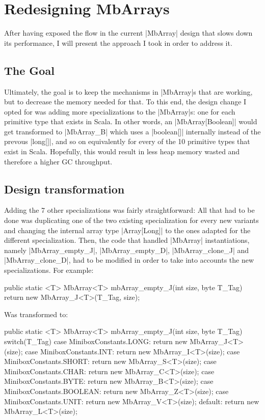 \section{Redesigning MbArrays}
\label{sec:redesign}

After having exposed the flow in the current |MbArray| design that slows down its performance, I will present the approach I took in order to address it.

\subsection{The Goal}

Ultimately, the goal is to keep the mechanisms in |MbArray|s that are working, but to decrease the memory needed for that.
To this end, the design change I opted for was adding more specializations to the |MbArray|s: one for each primitive type that exists in Scala. In other words, an |MbArray[Boolean]| would get transformed to |MbArray_B| which uses a |boolean[]| internally instead of the prevous |long[]|, and so on equivalently for every of the 10 primitive types that exist in Scala. Hopefully, this would result in less heap memory wasted and therefore a higher GC throughput.

\subsection{Design transformation}

Adding the 7 other specializations was fairly straightforward: All that had to be done was duplicating one of the two existing specialization for every new variants and changing the internal array type |Array[Long]| to the ones adapted for the different specialization.
Then, the code that handled |MbArray| instantiations, namely |MbArray_empty_J|, |MbArray_empty_D|, |MbArray_clone_J| and |MbArray_clone_D|, had to be modified in order to take into accounts the new specializations.
For example:

\begin{lstlisting-nobreak-java}
public static <T> MbArray<T> mbArray_empty_J(int size, byte T_Tag) {
  return new MbArray_J<T>(T_Tag, size);
}
\end{lstlisting-nobreak-java}

Was transformed to:

\begin{lstlisting-nobreak-java}
public static <T> MbArray<T> mbArray_empty_J(int size, byte T_Tag) {
  switch(T_Tag) {
  case MiniboxConstants.LONG:
    return new MbArray_J<T>(size);
  case MiniboxConstants.INT:
    return new MbArray_I<T>(size);
  case MiniboxConstants.SHORT:
    return new MbArray_S<T>(size);
  case MiniboxConstants.CHAR:
    return new MbArray_C<T>(size);
  case MiniboxConstants.BYTE:
    return new MbArray_B<T>(size);
  case MiniboxConstants.BOOLEAN:
    return new MbArray_Z<T>(size);
  case MiniboxConstants.UNIT:
    return new MbArray_V<T>(size);
  default:
    return new MbArray_L<T>(size);
  }
}
\end{lstlisting-nobreak-java}

